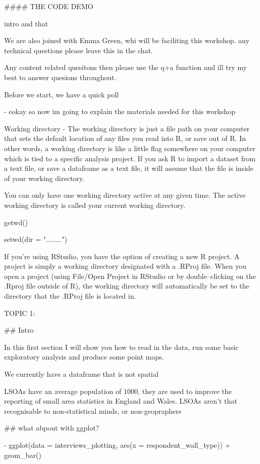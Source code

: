 \documentclass[12pt]{article}
\begin{document}
#### THE CODE DEMO 

intro and that

We are also joined with Emma Green, whi will be faciliting this workshop.  any technical questions please leave this in the chat.

Any content related quesitons then please use the q+a function and ill try my best to answer quesions throughout. 

Before we start, we have a quick poll

 
  - eokay so now im going to explain the materials needed for this workshop


Working directory -  The working directory is just a file path on your computer that sets the default location of any files you read into R, or save out of R. In other words, a working directory is like a little flag somewhere on your computer which is tied to a specific analysis project. If you ask R to import a dataset from a text file, or save a dataframe as a text file, it will assume that the file is inside of your working directory.

You can only have one working directory active at any given time. The active working directory is called your current working directory.

getwd()

setwd(dir = "........")

If you’re using RStudio, you have the option of creating a new R project. A project is simply a working directory designated with a .RProj file. When you open a project (using File/Open Project in RStudio or by double–clicking on the .Rproj file outside of R), the working directory will automatically be set to the directory that the .RProj file is located in.




TOPIC 1:

## Intro 

In this first section I will show you how to read in the data, run some basic exploratory analysis and produce some point maps. 

We currently have a dataframe that is not spatial

LSOAs have an average population of 1000, they are used to improve the reporting of small area statistics in England and Wales. 
LSOAs aren't that recognisable to non-statistical minds, or non-geopraphers 



## what abpout with ggplot?

- ggplot(data = interviews_plotting, aes(x = respondent_wall_type)) +
    geom_bar()
\end{document}

